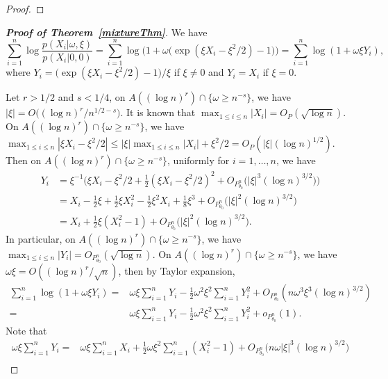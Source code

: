 \documentclass[11pt]{article}
\theoremstyle{plain}
\theoremstyle{definition}
\theoremstyle{remark}
\begin{document}
\begin{appendices}
\begin{proof}
\end{proof}


\begin{proof}[\textbf{Proof of Theorem~\ref{mixtureThm}}]
We have
\begin{equation*}
    \sum_{i=1}^n \log \frac{p(X_i|\omega,\xi)}{ p(X_i|0,0)}
    =\sum_{i=1}^n \log\Big(1+\omega \big(\exp(\xi X_i -\xi^2/2)-1\big)\Big)=\sum_{i=1}^n \log(1+\omega \xi Y_i),
\end{equation*}
where
$
Y_i=\big(\exp(\xi X_i -\xi^2/2)-1\big)/\xi
$ if $\xi \neq 0$ and $Y_i=X_i$ if $\xi =0$.

Let $r>1/2$ and $s< 1/4$, on $A((\log n)^r)\cap \{\omega\geq n^{-s}\}$,
we have $|\xi| = O\big((\log n)^{r}/n^{1/2-s}\big)$.
It is known that $\max_{1\leq i \leq n}|X_i|=O_P(\sqrt{\log n})$.
On $A((\log n)^r)\cap \{\omega\geq n^{-s}\}$, we have $\max_{1\leq i\leq n}|\xi X_i-\xi^2/2|\leq |\xi| \max_{1\leq i\leq n}|X_i|+\xi^2/2=O_P(|\xi|(\log n)^{1/2})$.
Then on $A((\log n)^r)\cap \{\omega\geq n^{-s}\}$, uniformly for $i=1,\ldots, n$, we have
\begin{align*}
Y_i&=\xi^{-1}\Big(\xi X_i-\xi^2/2 +\frac{1}{2}(\xi X_i-\xi^2/2)^2+O_{P^n_{\theta_0}} \big(|\xi|^3 (\log n)^{3/2}\big)\Big) 
    \\
    &=X_i-\frac{1}{2}\xi+\frac{1}{2} \xi X_i^2-\frac{1}{2} \xi^2 X_i +\frac{1}{8}\xi^3+O_{P^n_{\theta_0}} \big(|\xi|^2 (\log n)^{3/2}\big)
    \\
    &=X_i+\frac{1}{2} \xi (X_i^2-1) + O_{P^n_{\theta_0}} \big(|\xi|^2 (\log n)^{3/2}\big).
\end{align*}
In particular, on $A((\log n)^r)\cap \{\omega\geq n^{-s}\}$, we have $\max_{1\leq i \leq n}|Y_i|=O_{P^n_{\theta_0}}(\sqrt{\log n})$.
On $A((\log n)^r)\cap \{\omega\geq n^{-s}\}$, we have $\omega \xi =O((\log n)^r /\sqrt{n})$, then by Taylor expansion, 
\begin{align*}
    \sum_{i=1}^n \log(1+\omega \xi Y_i)
    =& \omega \xi\sum_{i=1}^n Y_i -\frac{1}{2} \omega^2 \xi^2 \sum_{i=1}^n Y_i^2+O_{P^n_{\theta_0}}(n\omega^3 \xi^3 (\log n)^{3/2})
    \\
    =& \omega \xi\sum_{i=1}^n Y_i -\frac{1}{2} \omega^2 \xi^2 \sum_{i=1}^n Y_i^2+o_{P^n_{\theta_0}}(1).
\end{align*}
Note that
\begin{align*}
    \omega \xi\sum_{i=1}^n Y_i
    =&
    \omega \xi\sum_{i=1}^n 
    X_i+\frac{1}{2} \omega \xi^2\sum_{i=1}^n (X_i^2-1) + O_{P^n_{\theta_0}} \big(n\omega |\xi|^3 (\log n)^{3/2}\big)
    \\

\end{align*}
\end{proof}
\end{appendices}
\end{document}
